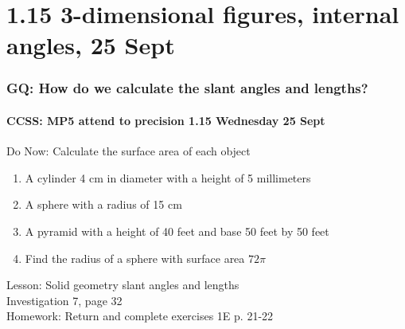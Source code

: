 \documentclass{beamer}
\begin{document}
  \section{1.15 3-dimensional figures, internal angles, 25 Sept}
  \frame
  {
    \frametitle{GQ: How do we calculate the slant angles and lengths?}
    \framesubtitle{CCSS: MP5 attend to precision \hfill \alert{1.15 Wednesday 25 Sept}}

    \begin{block}{Do Now: Calculate the surface area of each object}
      \begin{enumerate}
          \item A cylinder 4 cm in diameter with a height of 5 millimeters
          \item A sphere with a radius of 15 cm
          \item A pyramid with a height of 40 feet and base 50 feet by 50 feet
          \item Find the radius of a sphere with surface area $72 \pi$
      \end{enumerate}
      \end{block}
    Lesson: Solid geometry slant angles and lengths\\ \smallskip
    Investigation 7, page 32 \\ \bigskip
    Homework: Return and complete exercises 1E p. 21-22
  }
\end{document}

